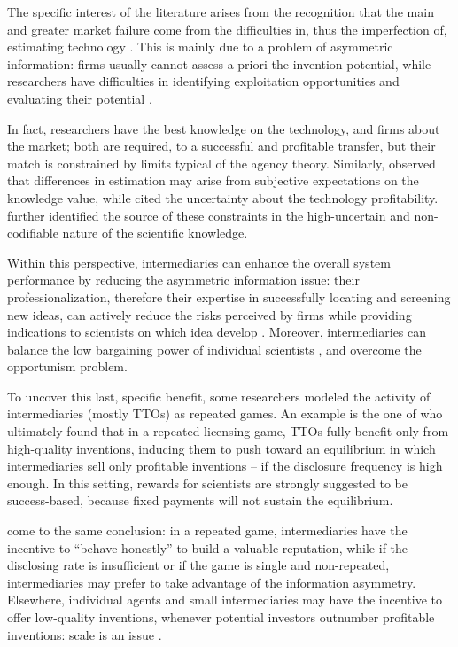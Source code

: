 The specific interest of the literature arises from the recognition that the main and greater market failure come from the difficulties in, thus the imperfection of, estimating technology \citep{Hoppe2005}. This is mainly due to a problem of asymmetric information: firms usually cannot assess a priori the invention potential, while researchers have difficulties in identifying exploitation opportunities and evaluating their potential \citep{Debackere2005}. 

In fact, researchers have the best knowledge on the technology, and firms about the market; both are required, to a successful and profitable transfer, but their match is constrained by limits typical of the agency theory. Similarly, \citet{Bercovitz2006} observed that differences in estimation may arise from subjective expectations on the knowledge value, while \citet{Hoppe2005} cited the uncertainty about the technology profitability. \citet{Debackere2005} further identified the source of these constraints in the high-uncertain and non-codifiable nature of the scientific knowledge.

Within this perspective, intermediaries can enhance the overall system performance by reducing the asymmetric information issue: their professionalization, therefore their expertise in successfully locating and screening new ideas, can actively reduce the risks perceived by firms while providing indications to scientists on which idea develop \citep{Debackere2005}. Moreover, intermediaries can balance the low bargaining power of individual scientists \citep{Bercovitz2006}, and overcome the opportunism problem.

To uncover this last, specific benefit, some researchers modeled the activity of intermediaries (mostly TTOs) as repeated games. An example is the one of \citet{Hoppe2005} who ultimately found that in a repeated licensing game, TTOs fully benefit only from high-quality inventions, inducing them to push toward an equilibrium in which intermediaries sell only profitable inventions – if the disclosure frequency is high enough. In this setting, rewards for scientists are strongly suggested to be success-based, because fixed payments will not sustain the equilibrium. 

\citet{Macho-Stadler2007} come to the same conclusion: in a repeated game, intermediaries have the incentive to \enquote{behave honestly} to build a valuable reputation, while if the disclosing rate is insufficient or if the game is single and non-repeated, intermediaries may prefer to take advantage of the information asymmetry. Elsewhere, individual agents and small intermediaries may have the incentive to offer low-quality inventions, whenever potential investors outnumber profitable inventions: scale is an issue \citep{Hoppe2005, Macho-Stadler2007}. 

